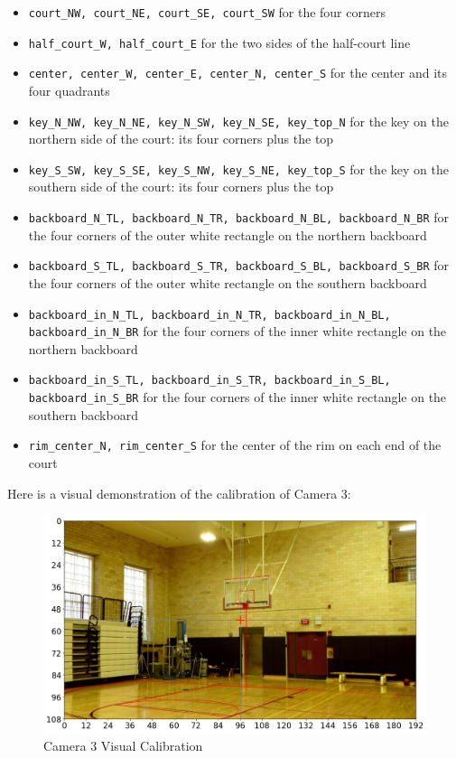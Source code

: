 \documentclass{article}
\begin{document}
\begin{itemize}
\item \texttt{court\_NW, court\_NE, court\_SE, court\_SW} for the four corners
\item \texttt{half\_court\_W, half\_court\_E} for the two sides of the half-court line
\item \texttt{center, center\_W, center\_E, center\_N, center\_S} for the center and its four quadrants
\item \texttt{key\_N\_NW, key\_N\_NE, key\_N\_SW, key\_N\_SE, key\_top\_N} 
for the key on the northern side of the court: its four corners plus the top
\item \texttt{key\_S\_SW, key\_S\_SE, key\_S\_NW, key\_S\_NE, key\_top\_S} 
for the key on the southern side of the court: its four corners plus the top
\item \texttt{backboard\_N\_TL, backboard\_N\_TR, backboard\_N\_BL, backboard\_N\_BR} 
for the four corners of the outer white rectangle on the northern backboard
\item \texttt{backboard\_S\_TL, backboard\_S\_TR, backboard\_S\_BL, backboard\_S\_BR} 
for the four corners of the outer white rectangle on the southern backboard
\item \texttt{backboard\_in\_N\_TL, backboard\_in\_N\_TR, backboard\_in\_N\_BL, backboard\_in\_N\_BR} 
for the four corners of the inner white rectangle on the northern backboard
\item \texttt{backboard\_in\_S\_TL, backboard\_in\_S\_TR, backboard\_in\_S\_BL, backboard\_in\_S\_BR} 
for the four corners of the inner white rectangle on the southern backboard
\item \texttt{rim\_center\_N, rim\_center\_S} for the center of the rim on each end of the court
\end{itemize}


Here is a visual demonstration of the calibration of Camera 3:
\begin{figure}[H]
\center
\includegraphics[width=1.00\textwidth]{Camera3_calibration.png}
\caption*{Camera 3 Visual Calibration}
\end{figure}
\end{document}
